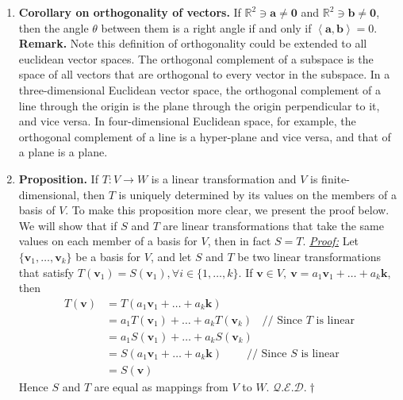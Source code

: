 \documentclass[oneside, 12pt]{book}
\newcommand{\settag}[1]{\renewcommand{\theenumi}{#1}}
\newcommand{\R}{\mathbb{R}}
\newcommand{\qed}{\hfill $\mathcal{Q}.\mathcal{E}.\mathcal{D}.\dagger$}
\newcommand{\tbf}[1]{\textbf{#1}}
\newcommand{\tit}[1]{\textit{#1}}
\newcommand{\proof}{\tit{\underline{Proof:}}} %
\newcommand{\vzero}{\mathbf{0}}
\begin{document}
\begin{enumerate}
        \settag{2.1.10}
        \item \tbf{Corollary on orthogonality of vectors.} If $\R^2\ni \mathbf{a}\neq \vzero$ and $\R^2\ni \mathbf{b}\neq \vzero$, then the angle $\theta$ between them is a right angle if and only if $\left<\mathbf{a},\mathbf{b}\right>=0$.\newline
        \tbf{Remark.} Note this definition of orthogonality could be extended to all euclidean vector spaces. The orthogonal complement of a subspace is the space of all vectors that are orthogonal to every vector in the subspace. In a three-dimensional Euclidean vector space, the orthogonal complement of a line through the origin is the plane through the origin perpendicular to it, and vice versa. In four-dimensional Euclidean space, for example, the orthogonal complement of a line is a hyper-plane and vice versa, and that of a plane is a plane.
        
        \settag{2.1.14}
        \item \tbf{Proposition.} If $T:V\xrightarrow{}W$ is a linear transformation and $V$ is finite-dimensional, then $T$ is uniquely determined by its values on the members of a basis of $V$. To make this proposition more clear, we present the proof below. We will show that if $S$ and $T$ are linear transformations that take the same values on each member of a basis for $V$, then in fact $S=T$.\newline
        \proof \newline
        Let $\{ \mathbf{v}_1, \ldots, \mathbf{v}_k\}$ be a basis for $V$, and let $S$ and $T$ be two linear transformations that satisfy $T(\mathbf{v}_1)=S(\mathbf{v}_1), \forall i \in \{1,\ldots,k\}$. If $\mathbf{v}\in V, ~\mathbf{v} = a_1\mathbf{v}_1 + \ldots + a_k\mathbf{k}$, then
        \begin{align*}
            T(\mathbf{v}) &= T(a_1\mathbf{v}_1 + \ldots + a_k\mathbf{k}) \\
            &= a_1T(\mathbf{v}_1) + \ldots + a_k T(\mathbf{v}_k)~~~~\text{// Since $T$ is linear}\\
            &= a_1S(\mathbf{v}_1) + \ldots + a_k S(\mathbf{v}_k) \\
            &= S(a_1\mathbf{v}_1 + \ldots + a_k\mathbf{k})~~~~~~~~~~\text{//  Since $S$ is linear} \\
            &=S(\mathbf{v})
        \end{align*}
        Hence $S$ and $T$ are equal as mappings from $V$ to $W$. \qed
        
    \end{enumerate}
    
\end{document}
